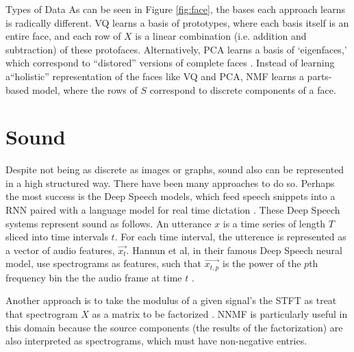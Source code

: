 \documentclass[12pt]{pom_thesis}
\begin{document}
\begin{chapter}{Types of Data}
As can be seen in Figure \ref{fig:face}, the bases each approach learns is radically different. VQ learns a basis of prototypes, where each basis itself is an entire face, and each row of $X$ is a linear combination (i.e. addition and subtraction) of these protofaces. Alternatively, PCA learns a basis of `eigenfaces,' which correspond to ``distored'' versions of complete faces \cite{turk1991eigenfaces}. Instead of learning a``holistic'' representation of the faces like VQ and PCA, NMF learns a parts-based model, where the rows of $S$ correspond to discrete components of a face. 

\section{Sound}
Despite not being as discrete as images or graphs, sound also can be represented in a high structured way. There have been many approaches to do so. Perhaps the most success is the Deep Speech models, which feed speech snippets into a RNN paired with a language model for real time dictation \cite{amodei2015deep,hannun2014deep}. These Deep Speech systems represent sound as follows. An utterance $x$ is a time series of length $T$	sliced into time intervals $t$. For each time interval, the utterence is represented as a vector of audio features, $\vec{x_t}$. Hannun et al, in their famous Deep Speech neural model, use spectrograms as features, such that $\vec{x_{t,p}}$ is the power of the $p$th frequency bin the the audio frame at time $t$ \cite{hannun2014deep}.

Another approach is to take the modulus of a given signal's the STFT as treat that spectrogram  $X$ as a matrix to be factorized \cite{kawamoto2000estimation,krause2015non}. NNMF is particularly useful in this domain because the source components (the results of the factorization) are also interpreted as spectrograms, which must have non-negative entries. 

\end{chapter}
\end{document}
